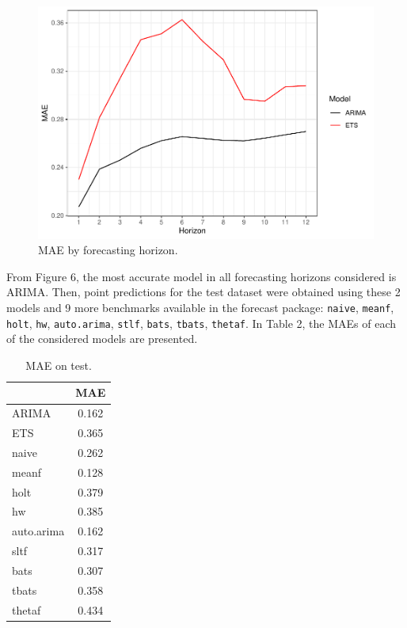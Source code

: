 \documentclass{statsoc}
\begin{document}
\begin{figure}

{\centering \includegraphics[height=0.4\textheight]{Trabalho_2_article_files/figure-latex/sliding-window-plot-1} 

}

\caption{MAE by forecasting horizon.}\label{fig:sliding-window-plot}
\end{figure}

From Figure 6, the most accurate model in all forecasting horizons
considered is ARIMA. Then, point predictions for the test dataset were
obtained using these 2 models and 9 more benchmarks available in the
forecast package: \texttt{naive}, \texttt{meanf}, \texttt{holt},
\texttt{hw}, \texttt{auto.arima}, \texttt{stlf}, \texttt{bats},
\texttt{tbats}, \texttt{thetaf}. In Table 2, the MAEs of each of the
considered models are presented.

\begin{table}

\caption{\label{tab:benchmark}MAE on test.}
\centering
\begin{tabular}[t]{lc}
\toprule
  & MAE\\
\midrule
ARIMA & 0.162\\
ETS & 0.365\\
naive & 0.262\\
meanf & 0.128\\
holt & 0.379\\
\addlinespace
hw & 0.385\\
auto.arima & 0.162\\
sltf & 0.317\\
bats & 0.307\\
tbats & 0.358\\
\addlinespace
thetaf & 0.434\\
\bottomrule
\end{tabular}
\end{table}
\end{document}
